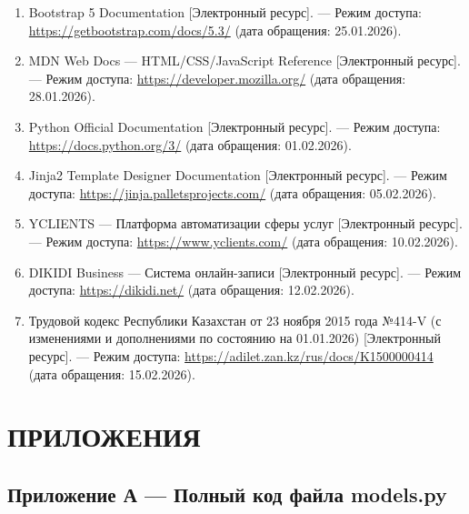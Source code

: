 \documentclass[14pt,a4paper,oneside]{extarticle}
\begin{document}
\begin{enumerate}[leftmargin=2cm]
    \item Bootstrap 5 Documentation [Электронный ресурс]. --- Режим доступа: \url{https://getbootstrap.com/docs/5.3/} (дата обращения: 25.01.2026).

    \item MDN Web Docs --- HTML/CSS/JavaScript Reference [Электронный ресурс]. --- Режим доступа: \url{https://developer.mozilla.org/} (дата обращения: 28.01.2026).

    \item Python Official Documentation [Электронный ресурс]. --- Режим доступа: \url{https://docs.python.org/3/} (дата обращения: 01.02.2026).

    \item Jinja2 Template Designer Documentation [Электронный ресурс]. --- Режим доступа: \url{https://jinja.palletsprojects.com/} (дата обращения: 05.02.2026).

    \item YCLIENTS --- Платформа автоматизации сферы услуг [Электронный ресурс]. --- Режим доступа: \url{https://www.yclients.com/} (дата обращения: 10.02.2026).

    \item DIKIDI Business --- Система онлайн-записи [Электронный ресурс]. --- Режим доступа: \url{https://dikidi.net/} (дата обращения: 12.02.2026).

    \item Трудовой кодекс Республики Казахстан от 23 ноября 2015 года №414-V (с изменениями и дополнениями по состоянию на 01.01.2026) [Электронный ресурс]. --- Режим доступа: \url{https://adilet.zan.kz/rus/docs/K1500000414} (дата обращения: 15.02.2026).
\end{enumerate}


\newpage
\section*{ПРИЛОЖЕНИЯ}

\subsection*{Приложение А --- Полный код файла models.py}
\end{document}
